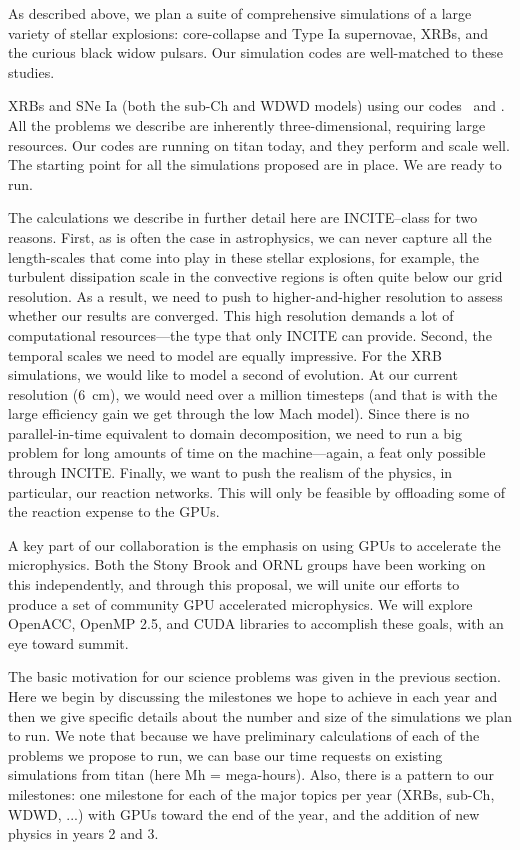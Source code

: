 As described above, we plan a suite of comprehensive simulations of a
large variety of stellar explosions: core-collapse and Type Ia
supernovae, XRBs, and the curious black widow pulsars.  Our simulation
codes are well-matched to these studies.  


XRBs and SNe Ia (both the sub-Ch and WDWD models) using our
codes \maestro\ and \castro.  All the problems we
describe are inherently three-dimensional, requiring large resources.
Our codes are running on titan today, and they perform and scale
well.  The starting point for all the simulations proposed are in
place.  We are ready to run.

The calculations we describe in further detail here are INCITE--class 
for two reasons.  First, as is often the case in astrophysics, we can
never capture all the length-scales that come into play in these
stellar explosions, for example, the turbulent dissipation scale in
the convective regions is often quite below our grid resolution.  As a
result, we need to push to higher-and-higher resolution to assess
whether our results are converged.  This high resolution demands a lot
of computational resources---the type that only INCITE can provide.
Second, the temporal scales we need to model are equally impressive.
For the XRB simulations, we would like to model a second of evolution.
At our current resolution (6~cm), we would need over a million
timesteps (and that is with the large efficiency gain we get through
the low Mach model).  Since there is no parallel-in-time equivalent to
domain decomposition, we need to run a big problem for long amounts of
time on the machine---again, a feat only possible through INCITE.
Finally, we want to push the realism of the physics, in particular,
our reaction networks.  This will only be feasible by offloading some
of the reaction expense to the GPUs.

A key part of our collaboration is the emphasis on using GPUs
to accelerate the microphysics.  Both the Stony Brook and ORNL
groups have been working on this independently, and through this
proposal, we will unite our efforts to produce a set of community
GPU accelerated microphysics.  We will explore OpenACC, OpenMP 2.5,
and CUDA libraries to accomplish these goals, with an eye toward
summit.


The basic motivation for our science problems was given in the
previous section.  Here we begin by discussing the milestones we hope
to achieve in each year and then we give specific details about the
number and size of the simulations we plan to run.  We note that because
we have preliminary calculations of each of the problems we propose to
run, we can base our time requests on existing simulations from titan
(here Mh = mega-hours).  Also, there is a pattern to our milestones:
one milestone for each of the major topics per year (XRBs, sub-Ch,
WDWD, ...) with GPUs toward the end of the year, and the addition of 
new physics in years 2 and 3.  

